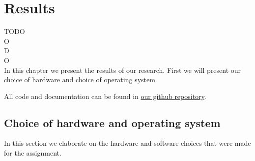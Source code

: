 \documentclass[12pt]{scrreprt}
\begin{document}
\chapter{Results}
TODO\\
O\\
D\\
O\\
In this chapter we present the results of our research. First we will present our choice of hardware and choice of operating system.
\par
All code and documentation can be found in \href{https://github.com/Yousousen/safety-module-for-care-robot-rose.git}{our github repository}.

\section{Choice of hardware and operating system}
\label{Choice of hardware and software}
In this section we elaborate on the hardware and software choices that were made for the assignment.
\end{document}
